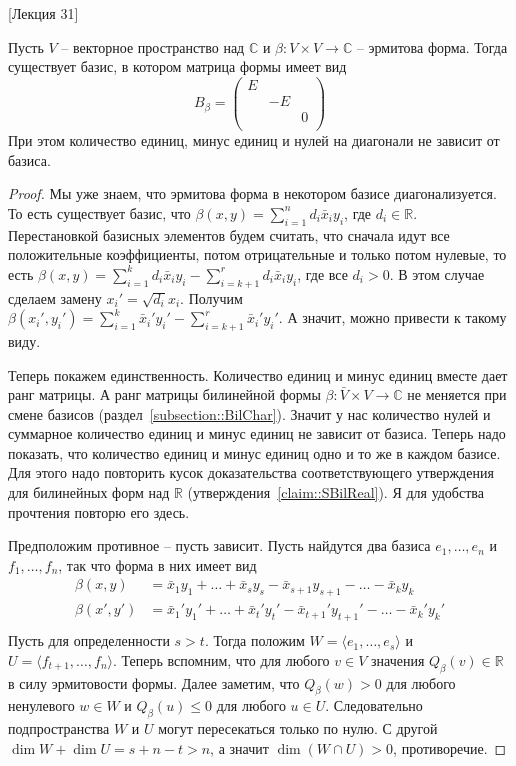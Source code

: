 [Лекция 31]


\begin{claim}
Пусть $V$ -- векторное пространство над $\mathbb C$ и $\beta\colon V\times V\to\mathbb C$ -- эрмитова форма.
Тогда существует базис, в котором матрица формы имеет вид
\[
B_\beta = 
\begin{pmatrix}
{E}&{}&{}\\
{}&{-E}&{}\\
{}&{}&{0}\\
\end{pmatrix}
\]
При этом количество единиц, минус единиц и нулей на диагонали не зависит от базиса.
\end{claim}
\begin{proof}
Мы уже знаем, что эрмитова форма в некотором базисе диагонализуется.
То есть существует базис, что $\beta(x, y) = \sum_{i=1}^n d_i \bar x_i y_i$, где $d_i\in \mathbb R$.
Перестановкой базисных элементов будем считать, что сначала идут все положительные коэффициенты, потом отрицательные и только потом нулевые, то есть $\beta(x,y) = \sum_{i=1}^k d_i \bar x_i y_i - \sum_{i=k+1}^r d_i \bar x_i y_i$, где все $d_i > 0$.
В этом случае сделаем замену $x_i' = \sqrt{d_i}x_i$.
Получим $\beta(x_i',y_i') = \sum_{i=1}^k \bar x_i' y_i' - \sum_{i=k+1}^r \bar x_i' y_i'$.
А значит, можно привести к такому виду.


Теперь покажем единственность.
Количество единиц и минус единиц вместе дает ранг матрицы.
А ранг матрицы билинейной формы $\beta\colon \bar V\times V\to \mathbb C$ не меняется при смене базисов (раздел~\ref{subsection::BilChar}).
Значит у нас количество нулей и суммарное количество единиц и минус единиц не зависит от базиса.
Теперь надо показать, что количество единиц и минус единиц одно и то же в каждом базисе.
Для этого надо повторить кусок доказательства соответствующего утверждения для билинейных форм над $\mathbb R$ (утверждения~\ref{claim::SBilReal}).
Я для удобства прочтения повторю его здесь.


Предположим противное -- пусть зависит.
Пусть найдутся два базиса $e_1,\ldots,e_n$ и $f_1,\ldots,f_n$, так что форма в них имеет вид
\begin{align*}
\beta(x, y) &= \bar x_1y_1+\ldots +\bar x_s y_s - \bar x_{s+1}y_{s+1} - \ldots - \bar x_k y_k\\
\beta(x',y') &= \bar x_1'y_1'+\ldots +\bar x_t' y_t' - \bar x_{t+1}' y_{t+1}' - \ldots - \bar x_k' y_k'\\
\end{align*}
Пусть для определенности $s > t$.
Тогда положим $W = \langle e_1,\ldots, e_s\rangle$ и $U = \langle f_{t+1},\ldots, f_n\rangle$.
Теперь вспомним, что для любого $v\in V$ значения $Q_\beta(v)\in \mathbb R$ в силу эрмитовости формы.
Далее заметим, что $Q_\beta(w) > 0$ для любого ненулевого $w\in W$ и $Q_\beta(u) \leqslant 0$ для любого $u\in U$.
Следовательно подпространства $W$ и $U$ могут пересекаться только по нулю.
С другой $\dim W+\dim U = s + n - t > n$, а значит $\dim(W\cap U) > 0$, противоречие.
\end{proof}

